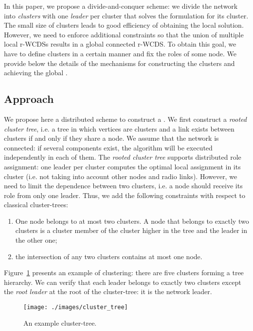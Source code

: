 \documentclass[twoside]{article}
\begin{document}
In this paper, we propose a divide-and-conquer scheme: we divide the
network into \emph{clusters} with one \emph{leader} per cluster that
solves the \milp formulation for its cluster. The small size of
clusters leads to good efficiency of obtaining the local \milp
solution. However, we need to enforce additional constraints so that
the union of multiple local r-WCDSs results in a global connected
r-WCDS.  To obtain this goal, we have to define clusters in a certain
manner and fix the roles of some node. We provide below the details of
the mechanisms for constructing the clusters and achieving the global
\rwcds.


\subsection{Approach}

We propose here a distributed scheme to construct a \rwcds. We first
construct a \emph{rooted cluster tree}, i.e. a tree in which
vertices are clusters and a link exists between clusters if and only if they
share a node. We assume that the network is connected: if several
components exist, the algorithm will be executed independently in each of
them. The \emph{rooted cluster tree} supports distributed role
assignment: one leader per cluster computes the optimal local
assignment in its cluster (i.e. not taking into account other nodes
and radio links). However, we need to limit the dependence between two
clusters, i.e. a node should receive its role from only one
leader. Thus, we add the following constraints with respect to
classical cluster-trees:
\begin{enumerate}
\item One node belongs to at most two clusters. A node that
  belongs to exactly two clusters is a cluster member of the cluster
  higher in the tree and the leader in the other one;
\item the intersection of any two clusters contains at most one node.
\end{enumerate}
Figure~\ref{fig:cluster_tree} presents an example of clustering: there
are five clusters forming a tree hierarchy. We can verify that each
leader belongs to exactly two clusters except the \emph{root leader}
at the root of the cluster-tree: it is the network leader.

\begin{figure}[!h]
\begin{center}
	\texttt{[image: ./images/cluster\_tree]}
	\caption{An example cluster-tree.}
	\label{fig:cluster_tree} 
\end{center}
\end{figure}
\end{document}
